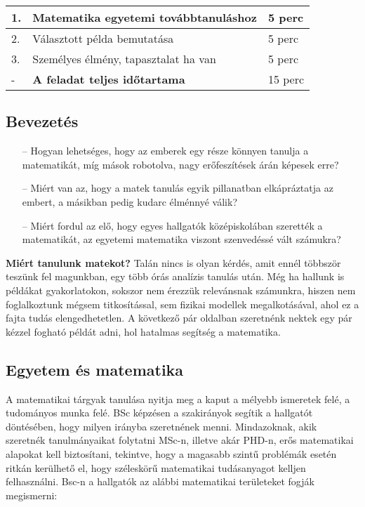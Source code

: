 \documentclass[../Main.tex]{subfiles}
\begin{document}
\begin{center}
    \begin{tabular}{| m{1.3 em} | m{} | m{} |}
    \hline
    1. & Matematika egyetemi továbbtanuláshoz & 5 perc \\
    \hline
    2. & Választott példa bemutatása & 5 perc \\
    \hline
    3. & Személyes élmény, tapasztalat ha van & 5 perc \\
    \hline
    - & \textbf{A feladat teljes időtartama} & 15 perc \\
    \hline
    \end{tabular}
\end{center}

\subsection{Bevezetés}

\begin{itemize}
    \item[--] Hogyan lehetséges, hogy az emberek egy része könnyen tanulja a matematikát, míg
mások robotolva, nagy erőfeszítések árán képesek erre?
    \item[--] Miért van az, hogy a matek tanulás egyik pillanatban elkápráztatja az embert, a
másikban pedig kudarc élménnyé válik?
    \item[--] Miért fordul az elő, hogy egyes hallgatók középiskolában szerették a matematikát, az
egyetemi matematika viszont szenvedéssé vált számukra?
\end{itemize}


\textbf{Miért tanulunk matekot?} Talán nincs is olyan kérdés, amit ennél többször teszünk fel magunkban,
egy több órás analízis tanulás után. Még ha hallunk
is példákat gyakorlatokon, sokszor nem érezzük relevánsnak számunkra,
hiszen nem foglalkoztunk mégsem titkosítással, sem fizikai modellek megalkotásával,
ahol ez a fajta tudás elengedhetetlen. A következő pár oldalban szeretnénk nektek 
egy pár kézzel fogható példát adni, hol hatalmas segítség a matematika. 


\subsection{Egyetem és matematika}
A matematikai tárgyak tanulása nyitja meg a kaput a mélyebb ismeretek felé, a tudományos munka felé.
BSc képzésen a szakirányok segítik a hallgatót döntésében, hogy milyen irányba szeretnének menni.
Mindazoknak, akik szeretnék tanulmányaikat folytatni MSc-n, illetve akár PHD-n,
erős matematikai alapokat kell biztosítani, tekintve, hogy a magasabb szintű problémák esetén ritkán kerülhető el,
hogy széleskörű matematikai tudásanyagot kelljen felhasználni. Bsc-n a hallgatók az alábbi 
matematikai területeket fogják megismerni:
\end{document}
